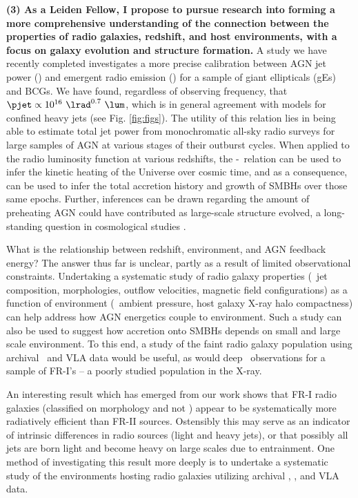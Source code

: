 \documentclass[11pt]{article}
\begin{document}
{\bf{(3) As a Leiden Fellow, I propose to pursue research into forming
a more comprehensive understanding of the connection between the
properties of radio galaxies, redshift, and host environments, with a
focus on galaxy evolution and structure formation.}} A study we have
recently completed \cite{pjet} investigates a more precise calibration
between AGN jet power (\pjet) and emergent radio emission (\lrad) for
a sample of giant ellipticals (gEs) and BCGs. We have found,
regardless of observing frequency, that $\pjet \propto 10^{16}
~\lrad^{0.7}~\lum$, which is in general agreement with models for
confined heavy jets (see Fig. \ref{fig:figs}). The utility of this
relation lies in being able to estimate total jet power from
monochromatic all-sky radio surveys for large samples of AGN at
various stages of their outburst cycles. When applied to the radio
luminosity function at various redshifts, the
\pjet-\lrad\ relation can be used to infer the kinetic heating of the
Universe over cosmic time, and as a consequence, can be used to infer
the total accretion history and growth of SMBHs over those same
epochs. Further, inferences can be drawn regarding the amount of
preheating AGN could have contributed as large-scale structure
evolved, a long-standing question in cosmological studies
\cite[\ie][]{2001ApJ...555..597B}.

What is the relationship between redshift, environment, and AGN
feedback energy? The answer thus far is unclear, partly as a result of
limited observational constraints. Undertaking a systematic study of
radio galaxy properties (\ie\ jet composition, morphologies, outflow
velocities, magnetic field configurations) as a function of
environment (\ie\ ambient pressure, host galaxy X-ray halo
compactness) can help address how AGN energetics couple to
environment. Such a study can also be used to suggest how accretion
onto SMBHs depends on small and large scale environment. To this end,
a study of the faint radio galaxy population using archival \chandra\
and VLA data would be useful, as would deep \chandra\ observations for
a sample of FR-I's -- a poorly studied population in the X-ray.

An interesting result which has emerged from our work shows that FR-I
radio galaxies (classified on morphology and not \lrad) appear to be
systematically more radiatively efficient than FR-II
sources. Ostensibly this may serve as an indicator of intrinsic
differences in radio sources (light and heavy jets), or that possibly
all jets are born light and become heavy on large scales due to
entrainment. One method of investigating this result more deeply is to
undertake a systematic study of the environments hosting radio
galaxies utilizing archival \chandra, \xmm, and VLA data.
\end{document}
